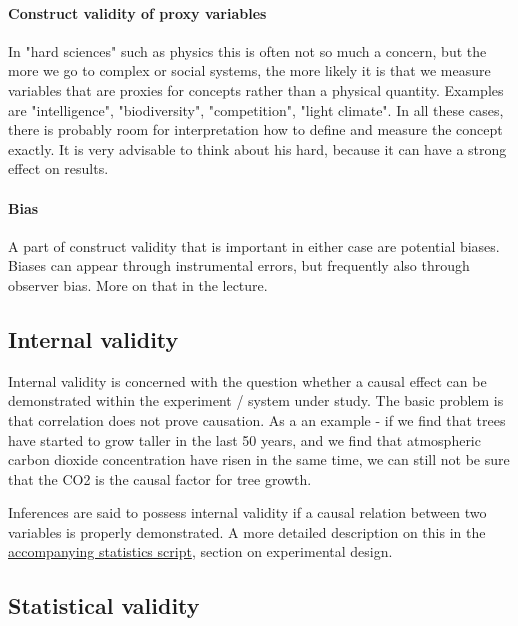 \documentclass{tufte-book}
\begin{document}
\paragraph{Construct validity of proxy variables} In "hard sciences" such as physics this is often not so much a concern, but the more we go to complex or social systems, the more likely it is that we measure variables that are proxies for concepts rather than a physical quantity. Examples are "intelligence", "biodiversity", "competition", "light climate". In all these cases, there is probably room for interpretation how to define and measure the concept exactly. It is very advisable to think about his hard, because it can have a strong effect on results. 

\paragraph{Bias} A part of construct validity that is important in either case are potential biases. Biases can appear through instrumental errors, but frequently also through observer bias. More on that in the lecture. 


\subsection{Internal validity}

Internal validity is concerned with the question whether a causal effect can be demonstrated within the experiment / system under study. The basic problem is that correlation does not prove causation. As a an example - if we find that trees have started to grow taller in the last 50 years, and we find that atmospheric carbon dioxide concentration have risen in the same time, we can still not be sure that the CO2 is the causal factor for tree growth. 

Inferences are said to possess internal validity if a causal relation between two variables is properly demonstrated. A more detailed description on this in the \href{https://github.com/florianhartig/ResearchSkills/raw/master/Labs/Statistics/Script/EssentialStatistics.pdf}{accompanying statistics script}, section on experimental design.


\subsection{Statistical validity}
\end{document}
